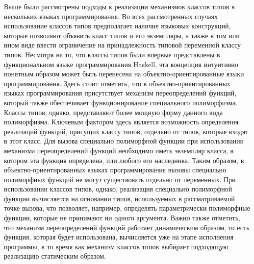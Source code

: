 Выше были рассмотрены подходы к реализации механизмов классов типов в нескольких языках программирования. Во всех рассмотренных случаях использование классов типов предполагает наличие языковых конструкций, которые позволяют объявить класс типов и его экземпляры, а также в том или ином виде ввести ограничение на принадлежность типовой переменной классу типов. 
Несмотря на то, что классы типов были впервые представлены в функциональном языке программирования Haskell, эта концепция интуитивно понятным образом может быть перенесена на объектно-ориентированные языки программирования. Здесь стоит отметить, что в объектно-ориентированных языках программирования присутствует механизм переопределений функций, который также обеспечивает функционирование специального полиморфизма. Классы типов, однако, представляют более мощную форму данного вида полиморфизма. Ключевым фактором здесь является возможность определения реализаций функций, присущих классу типов, отдельно от типов, которые входят в этот класс. Для вызова специально полиморфной функции при использовании механизма переопределений функций необходимо иметь экземпляр класса, в котором эта функция определена, или любого его наследника. Таким образом, в объектно-ориентированных языках программирования вызовы специально полиморфных функций не могут существовать отдельно от переменных. При использовании классов типов, однако, реализация специально полиморфной функции вычисляется на основании типов, используемых в рассматриваемой точке вызова, что позволяет, например, определять параметрически полиморфные функции, которые не принимают ни одного аргумента. Важно также отметить, что механизм переопределений функций работает динамическим образом, то есть функция, которая будет использована, вычисляется уже на этапе исполнения программы, в то время как механизм классов типов выбирает подходящую реализацию статическим образом.